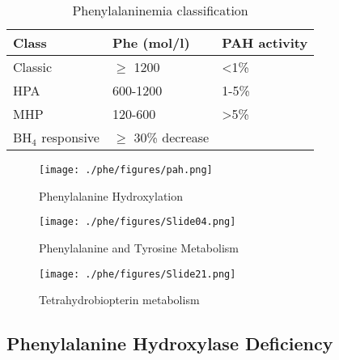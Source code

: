 \documentclass{scrartcl}
\begin{document}
\begin{table}[htbp]
\caption{\label{tab:org3e0d791}
Phenylalaninemia classification}
\centering
\begin{tabular}{lll}
Class & Phe (\textmu{}mol/l) & PAH activity\\
\hline
Classic & \(\ge\) 1200 & \textless{}1\%\\
HPA & 600-1200 & 1-5\%\\
MHP & 120-600 & \textgreater{}5\%\\
BH\(_{\text{4}}\) responsive & \(\ge\) 30\% decrease & \\
\end{tabular}
\end{table}

\begin{figure}[htbp]
\centering
\texttt{[image: ./phe/figures/pah.png]}
\caption{\label{fig:org9af27bb}
Phenylalanine Hydroxylation}
\end{figure}

\begin{figure}[htbp]
\centering
\texttt{[image: ./phe/figures/Slide04.png]}
\caption{\label{fig:orgca1f1ea}
Phenylalanine and Tyrosine Metabolism}
\end{figure}

\begin{figure}[htbp]
\centering
\texttt{[image: ./phe/figures/Slide21.png]}
\caption{\label{fig:org016f7f3}
Tetrahydrobiopterin metabolism}
\end{figure}

\subsection{Phenylalanine Hydroxylase Deficiency}
\label{sec:orgbe31247}
\end{document}
